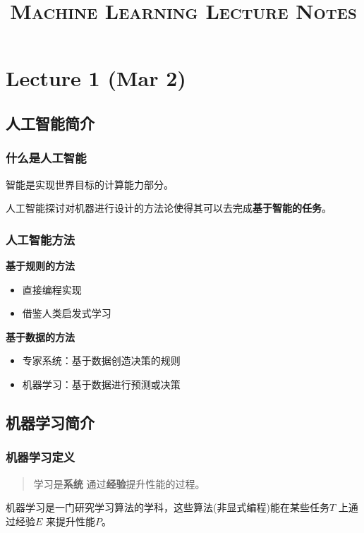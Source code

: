 
\linespread{1.5} \selectfont
\title{\textsc{Machine Learning Lecture Notes}}

\maketitle
\tableofcontents
\chapter{Lecture 1 (Mar 2)}
\section{人工智能简介}
\subsection{什么是人工智能}
智能是实现世界目标的计算能力部分。

人工智能探讨对机器进行设计的方法论使得其可以去完成\textbf{基于智能的任务}。
\subsection{人工智能方法}
\noindent \textbf{基于规则的方法}
\begin{itemize}
		\item 直接编程实现
		\item 借鉴人类启发式学习
\end{itemize}

\noindent \textbf{基于数据的方法}
\begin{itemize}
		\item 专家系统：基于数据创造决策的规则
		\item 机器学习：基于数据进行预测或决策
\end{itemize}
\section{机器学习简介}
\subsection{机器学习定义}
\begin{quotation}
		学习是\textbf{系统} 通过\textbf{经验}提升性能的过程。
\end{quotation}
\begin{defi}
		机器学习是一门研究学习算法的学科，这些算法(非显式编程)能在某些任务$T$ 上通过经验$E$ 来提升性能$P$。
\end{defi}

